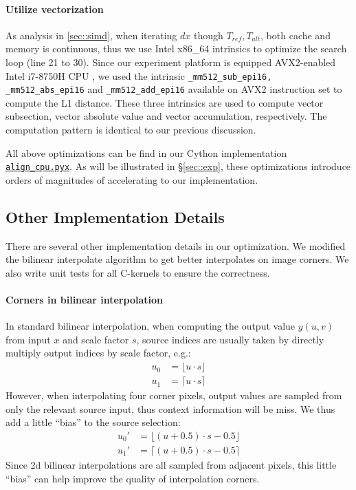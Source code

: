 \documentclass[conference, 10pt]{IEEEtran}
\makeatletter
\newcommand*{\eg}{e.g.\@\xspace}
\makeatother
\begin{document}
\paragraph{Utilize vectorization} As analysis in \ref{sec::simd}, when iterating $dx$ though
$T_{ref}, T_{alt}$, both cache and memory is continuous, thus we use Intel x86\_64
intrinsics to optimize the search loop (line 21 to 30). Since our experiment platform
is equipped AVX2-enabled Intel i7-8750H CPU \cite{Intel8750}, we used the intrinsic
{\tt \_mm512\_sub\_epi16, \_mm512\_abs\_epi16} and {\tt \_mm512\_add\_epi16} available on AVX2 instruction set
to compute the L1 distance. These three intrinsics are used to compute vector subsection,
vector absolute value and vector accumulation, respectively.
The computation pattern is identical to our previous discussion.

All above optimizations can be find in our Cython implementation 
\href{https://github.com/CrazyRundong/burst-align/blob/master/align/align_cpu.pyx}{\texttt{align\_cpu.pyx}}.
As will be illustrated in \S \ref{sec::exp},
these optimizations introduce orders of magnitudes of accelerating to our implementation.

\subsection{Other Implementation Details}

There are several other implementation details in our optimization. We modified the
bilinear interpolate algorithm to get better interpolates on image corners. We also
write unit tests for all C-kernels to ensure the correctness.

\paragraph{Corners in bilinear interpolation} In standard bilinear interpolation, 
when computing the output value $y(u, v)$ from input $x$ and scale factor $s$, source indices
are usually taken by directly multiply output indices by scale factor, \eg:
\begin{align*}
    u_0 &= \lfloor u \cdot s \rfloor \\
    u_1 &= \lceil u \cdot s \rceil
\end{align*}
However, when interpolating four corner pixels, output values are sampled from only the relevant
source input, thus context information will be miss. We thus add a little ``bias''
to the source selection:
\begin{align*}
    u_0' &= \lfloor (u + 0.5) \cdot s - 0.5\rfloor \\
    u_1' &= \lceil (u + 0.5) \cdot s - 0.5\rceil
\end{align*}
Since 2d bilinear interpolations are all sampled from adjacent pixels, this little
``bias'' can help improve the quality of interpolation corners.
\end{document}
